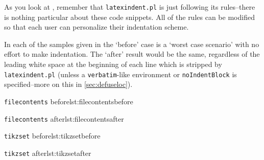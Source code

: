 \documentclass[11pt]{article}
\newenvironment{sidebyside}{\begin{adjustwidth}{-3cm}{1cm}}{\end{adjustwidth}}
\begin{document}
As you look at , remember
that \lstinline!latexindent.pl! is just following its rules--there is nothing
particular about these code snippets. All of the rules can be modified
so that each user can personalize their indentation scheme.

In each of the samples given in 
the `before' case is a `worst case scenario' with no effort to make indentation. The `after'
result would be the same, regardless of the leading white space at the beginning of
each line which is stripped by \lstinline!latexindent.pl! (unless a \lstinline!verbatim!-like
environment or \lstinline!noIndentBlock! is specified--more on this in \cref{sec:defuseloc}).

  \begin{sidebyside}
	\noindent
	\begin{minipage}{.6\textwidth}
		\begin{cmhlistings}[style=demo]{\lstinline!filecontents! before}{lst:filecontentsbefore}
\begin{filecontents}{mybib.bib}
@online{strawberryperl,
title="Strawberry Perl",
url="http://strawberryperl.com/"}
@online{cmhblog,
title="A Perl script ...
url="...
\end{filecontents}
		\end{cmhlistings}
	\end{minipage}%
	\noindent
	\begin{minipage}{.6\textwidth}
		\begin{cmhlistings}[style=demo]{\lstinline!filecontents! after}{lst:filecontentsafter}
\begin{filecontents}{mybib.bib}
	@online{strawberryperl,
		title="Strawberry Perl",
		url="http://strawberryperl.com/"}
	@online{cmhblog,
		title="A Perl script for ...
		url="...
\end{filecontents}
		\end{cmhlistings}
	\end{minipage}
	\begin{minipage}{.6\textwidth}
		\begin{cmhlistings}[style=demo]{\lstinline!tikzset! before}{lst:tikzsetbefore}
		\end{cmhlistings}
	\end{minipage}%
	\begin{minipage}{.6\textwidth}
		\begin{cmhlistings}[style=demo]{\lstinline!tikzset! after}{lst:tikzsetafter}

\end{cmhlistings}
\end{minipage}
\end{sidebyside}
\end{document}
